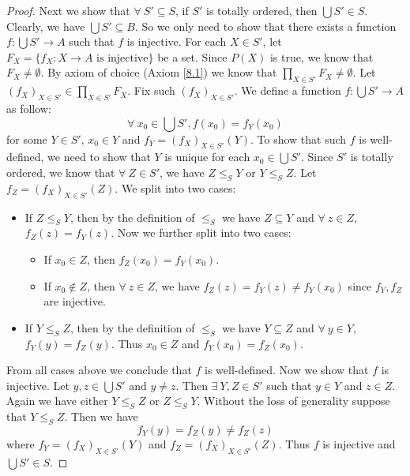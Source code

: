 \begin{proof}
    Next we show that \(\forall\ S' \subseteq S\), if \(S'\) is totally ordered, then \(\bigcup S' \in S\).
    Clearly, we have \(\bigcup S' \subseteq B\).
    So we only need to show that there exists a function \(f : \bigcup S' \to A\) such that \(f\) is injective.
    For each \(X \in S'\), let \(F_X = \{f_X : X \to A \text{ is injective}\}\) be a set.
    Since \(P(X)\) is true, we know that \(F_X \neq \emptyset\).
    By axiom of choice (Axiom \ref{8.1}) we know that \(\prod_{X \in S'} F_X \neq \emptyset\).
    Let \((f_X)_{X \in S'} \in \prod_{X \in S'} F_X\).
    Fix such \((f_X)_{X \in S'}\).
    We define a function \(f : \bigcup S' \to A\) as follow:
    \[
        \forall\ x_0 \in \bigcup S', f(x_0) = f_Y(x_0)
    \]
    for some \(Y \in S'\), \(x_0 \in Y\) and \(f_Y = (f_X)_{X \in S'}(Y)\).
    To show that such \(f\) is well-defined, we need to show that \(Y\) is unique for each \(x_0 \in \bigcup S'\).
    Since \(S'\) is totally ordered, we know that \(\forall\ Z \in S'\), we have \(Z \leq_S Y\) or \(Y \leq_S Z\).
    Let \(f_Z = (f_X)_{X \in S'}(Z)\).
    We split into two cases:
    \begin{itemize}
        \item If \(Z \leq_S Y\), then by the definition of \(\leq_S\) we have \(Z \subseteq Y\) and \(\forall\ z \in Z\), \(f_Z(z) = f_Y(z)\).
              Now we further split into two cases:
              \begin{itemize}
                  \item If \(x_0 \in Z\), then \(f_Z(x_0) = f_Y(x_0)\).
                  \item If \(x_0 \notin Z\), then \(\forall\ z \in Z\), we have \(f_Z(z) = f_Y(z) \neq f_Y(x_0)\) since \(f_Y, f_Z\) are injective.
              \end{itemize}
        \item If \(Y \leq_S Z\), then by the definition of \(\leq_S\) we have \(Y \subseteq Z\) and \(\forall\ y \in Y\), \(f_Y(y) = f_Z(y)\).
              Thus \(x_0 \in Z\) and \(f_Y(x_0) = f_Z(x_0)\).
    \end{itemize}
    From all cases above we conclude that \(f\) is well-defined.
    Now we show that \(f\) is injective.
    Let \(y, z \in \bigcup S'\) and \(y \neq z\).
    Then \(\exists\ Y, Z \in S'\) such that \(y \in Y\) and \(z \in Z\).
    Again we have either \(Y \leq_S Z\) or \(Z \leq_S Y\).
    Without the loss of generality suppose that \(Y \leq_S Z\).
    Then we have
    \[
        f_Y(y) = f_Z(y) \neq f_Z(z)
    \]
    where \(f_Y = (f_X)_{X \in S'}(Y)\) and \(f_Z = (f_X)_{X \in S'}(Z)\).
    Thus \(f\) is injective and \(\bigcup S' \in S\).


\end{proof}
